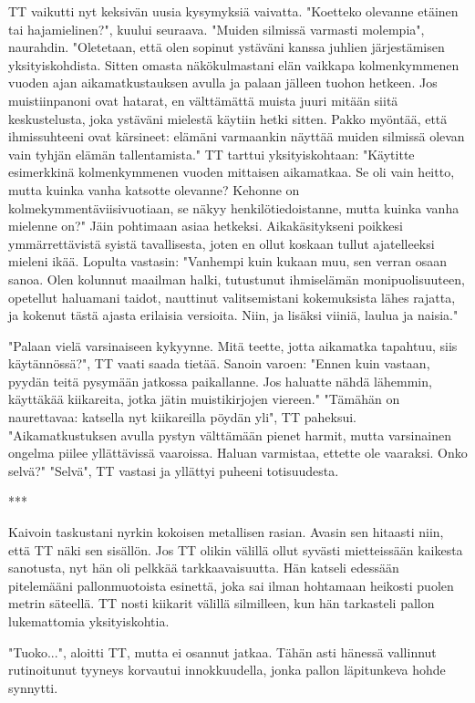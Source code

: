 ﻿\documentclass[a4paper, 12pt, finnish]{article}
\begin{document}
TT vaikutti nyt keksivän uusia kysymyksiä vaivatta.
"Koetteko olevanne etäinen tai hajamielinen?", kuului seuraava.
"Muiden silmissä varmasti molempia", naurahdin. "Oletetaan, että
olen sopinut ystäväni kanssa juhlien järjestämisen yksityiskohdista.
Sitten omasta näkökulmastani elän vaikkapa kolmenkymmenen vuoden
ajan aikamatkustauksen avulla ja palaan jälleen tuohon hetkeen.
Jos muistiinpanoni ovat hatarat, en välttämättä muista juuri
mitään siitä keskustelusta, joka ystäväni mielestä
käytiin hetki sitten. Pakko myöntää, että ihmissuhteeni ovat
kärsineet: elämäni varmaankin näyttää muiden silmissä olevan
vain tyhjän elämän tallentamista."
TT tarttui yksityiskohtaan: "Käytitte esimerkkinä kolmenkymmenen
vuoden mittaisen aikamatkaa. Se oli vain heitto, mutta kuinka
vanha katsotte olevanne? Kehonne on kolmekymmentäviisivuotiaan,
se näkyy henkilötiedoistanne, mutta kuinka vanha mielenne on?"
Jäin pohtimaan asiaa hetkeksi. Aikakäsitykseni poikkesi
ymmärrettävistä syistä tavallisesta, joten en ollut koskaan
tullut ajatelleeksi mieleni ikää. Lopulta vastasin:
"Vanhempi kuin kukaan
muu, sen verran osaan sanoa. Olen kolunnut maailman halki,
tutustunut ihmiselämän monipuolisuuteen, opetellut haluamani
taidot, nauttinut valitsemistani kokemuksista lähes rajatta,
ja kokenut tästä ajasta erilaisia versioita. Niin, ja lisäksi
viiniä, laulua ja naisia."

"Palaan vielä varsinaiseen kykyynne. Mitä teette,
jotta aikamatka tapahtuu, siis käytännössä?", TT vaati saada
tietää. Sanoin varoen: "Ennen kuin vastaan, pyydän teitä
pysymään jatkossa paikallanne. Jos haluatte nähdä lähemmin,
käyttäkää kiikareita, jotka jätin muistikirjojen viereen."
"Tämähän on naurettavaa: katsella nyt kiikareilla pöydän yli",
TT paheksui.
"Aikamatkustuksen avulla pystyn välttämään pienet harmit,
mutta varsinainen ongelma piilee yllättävissä vaaroissa. Haluan
varmistaa, ettette ole vaaraksi. Onko selvä?" 
"Selvä", TT vastasi ja yllättyi puheeni totisuudesta.

***

Kaivoin taskustani nyrkin kokoisen metallisen rasian. Avasin sen
hitaasti niin, että TT näki sen sisällön. Jos TT olikin välillä
ollut syvästi mietteissään kaikesta sanotusta, nyt hän oli
pelkkää tarkkaavaisuutta. Hän katseli edessään pitelemääni
pallonmuotoista esinettä, joka sai ilman hohtamaan heikosti
puolen metrin säteellä. TT nosti kiikarit välillä silmilleen,
kun hän tarkasteli pallon lukemattomia yksityiskohtia.

"Tuoko...", aloitti TT, mutta ei osannut jatkaa.
Tähän asti hänessä vallinnut rutinoitunut tyyneys
korvautui innokkuudella, jonka pallon läpitunkeva hohde synnytti.
\end{document}

